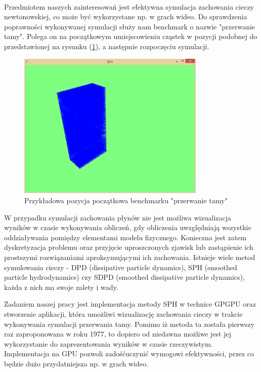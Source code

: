 \documentclass[polish, 12pt]{aghthesis}
\begin{document}
	$\,$

		Przedmiotem naszych zainteresowań jest efektywna symulacja zachowania cieczy newtonowskiej, co może być wykorzystane np. w grach wideo. Do sprawdzenia poprawności wykonywanej symulacji służy nam benchmark o nazwie "przerwanie tamy". Polega on na początkowym umiejscowieniu cząstek w pozycji podobnej do przedstawionej na rysunku (\ref{img:przerwanie_tamy}), a następnie rozpoczęciu symulacji. 
		
	\begin{figure}[h!]
		\centering
		\includegraphics[width=0.8\textwidth]{starting_position.png}
		\caption{Przykładowa pozycja początkowa benchmarku "przerwanie tamy"}
		\label{img:przerwanie_tamy}
	\end{figure}
	
	W przypadku symulacji zachowania płynów nie jest możliwa wizualizacja wyników w czasie wykonywania obliczeń, gdy obliczenia uwzględniają wszystkie oddziaływania pomiędzy elementami modelu fizycznego. Konieczna jest zatem dyskretyzacja problemu oraz przyjęcie uproszczonych zjawisk lub zastąpienie ich prostszymi rozwiązaniami aproksymującymi ich zachowania. Istnieje wiele metod symulowania cieczy - DPD (dissipative particle dynamics), SPH (smoothed particle hydrodynamics) czy SDPD (smoothed dissipative particle dynamics), każda z nich ma swoje zalety i wady.

	Zadaniem naszej pracy jest implementacja metody SPH w technice GPGPU oraz stworzenie aplikacji, która umożliwi wizualizację zachowania cieczy w trakcie wykonywania symulacji przerwania tamy. Pomimo iż metoda ta została pierwszy raz zaproponowana w roku 1977, to dopiero od niedawna możliwe jest jej wykorzystanie do zaprezentowania wyników w czasie rzeczywistym. Implementacja na GPU pozwoli zadośćuczynić wymogowi efektywności, przez co będzie dużo przydatniejsza np. w grach wideo.
\end{document}
